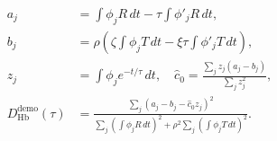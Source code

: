 \documentclass{article}
\begin{document}
\fontsize{22}{29}\selectfont
\[
\begin{aligned}a_j&=\int\phi_j R\,dt-\tau\int\phi'_jR\,dt,\\b_j&=\rho\left(\zeta\int\phi_jT\,dt-\xi\tau\int\phi'_jT\,dt\right),\\z_j&=\int\phi_j e^{-t/\tau}\,dt,\quad\widehat c_0=\frac{\sum_jz_j(a_j-b_j)}{\sum_jz_j^2},\\D_{\mathrm{Hb}}^{\mathrm{demo}}(\tau)&=\frac{\sum_j(a_j-b_j-\widehat c_0z_j)^2}{\sum_j(\int\phi_jR\,dt)^2+\rho^2\sum_j(\int\phi_jT\,dt)^2}.\end{aligned}
\]
\end{document}
